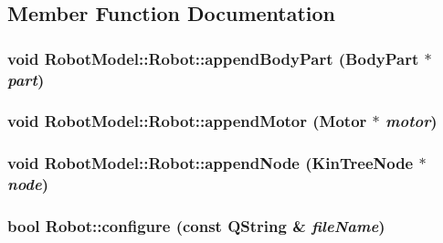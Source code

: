\subsection{Member Function Documentation}
\hypertarget{class_robot_model_1_1_robot_a44d1922d7d9ea6c7c90360c2443b1ec3}{
\subsubsection[{appendBodyPart}]{\setlength{\rightskip}{0pt plus 5cm}void RobotModel::Robot::appendBodyPart ({\bf BodyPart} $\ast$ {\em part})}}
\label{class_robot_model_1_1_robot_a44d1922d7d9ea6c7c90360c2443b1ec3}
\hypertarget{class_robot_model_1_1_robot_aa4db18e00b4e4c56a37943a0b45d1c3b}{
\subsubsection[{appendMotor}]{\setlength{\rightskip}{0pt plus 5cm}void RobotModel::Robot::appendMotor ({\bf Motor} $\ast$ {\em motor})}}
\label{class_robot_model_1_1_robot_aa4db18e00b4e4c56a37943a0b45d1c3b}
\hypertarget{class_robot_model_1_1_robot_aa6a72690fe4b0d1a2178f5478d3829bf}{
\subsubsection[{appendNode}]{\setlength{\rightskip}{0pt plus 5cm}void RobotModel::Robot::appendNode ({\bf KinTreeNode} $\ast$ {\em node})}}
\label{class_robot_model_1_1_robot_aa6a72690fe4b0d1a2178f5478d3829bf}
\hypertarget{class_robot_model_1_1_robot_a9ca9887b212f3233d101d95854cf2c79}{
\subsubsection[{configure}]{\setlength{\rightskip}{0pt plus 5cm}bool Robot::configure (const QString \& {\em fileName})}}
\label{class_robot_model_1_1_robot_a9ca9887b212f3233d101d95854cf2c79}


